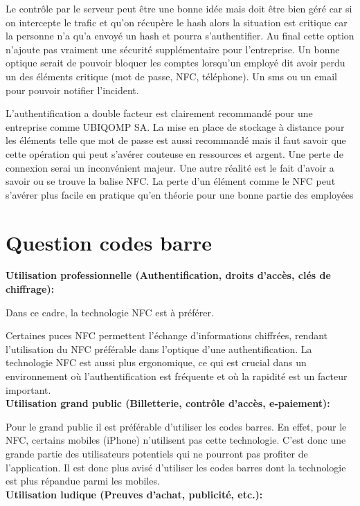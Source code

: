 \documentclass[12pt]{article}
\begin{document}
Le contrôle par le serveur peut être une bonne idée mais doit être bien géré car si on intercepte le trafic et qu'on récupère le hash alors la situation est critique car la personne n'a qu'a envoyé un hash et pourra s'authentifier. Au final cette option n'ajoute pas vraiment une sécurité supplémentaire pour l'entreprise.
Un bonne optique serait de pouvoir bloquer les comptes lorsqu'un employé dit avoir perdu un des éléments critique (mot de passe, NFC, téléphone). Un sms ou un email pour pouvoir notifier l'incident.

L'authentification a double facteur est clairement recommandé pour une entreprise comme UBIQOMP SA. La mise en place de stockage à distance pour les éléments telle que mot de passe est aussi recommandé mais il faut savoir que cette opération qui peut s’avérer couteuse en ressources et argent. Une perte de connexion serai un inconvénient majeur. Une autre réalité est le fait d'avoir a savoir ou se trouve la balise NFC. La perte d'un élément comme le NFC peut s’avérer plus facile en pratique qu'en théorie pour une bonne partie des employées

\section*{Question codes barre}

\textbf{Utilisation professionnelle (Authentification, droits d'accès, clés de chiffrage):}
\medskip

Dans ce cadre, la technologie NFC est à préférer.

Certaines puces NFC permettent l'échange d'informations chiffrées, rendant l'utilisation du NFC préférable dans l'optique d'une authentification.
La technologie NFC est aussi plus ergonomique, ce qui est crucial dans un environnement où l'authentification est fréquente et où la rapidité est un facteur important. \\

\textbf{Utilisation grand public (Billetterie, contrôle d'accès, e-paiement):} \medskip

Pour le grand public il est préférable d'utiliser les codes barres. En effet, pour le NFC, certains mobiles (iPhone) n'utilisent pas cette technologie. C'est donc une grande partie des utilisateurs potentiels qui ne pourront pas profiter de l'application. Il est donc plus avisé d'utiliser les codes barres dont la technologie est plus répandue parmi les mobiles.\\

\textbf{Utilisation ludique (Preuves d'achat, publicité, etc.):}
\medskip
\end{document}

